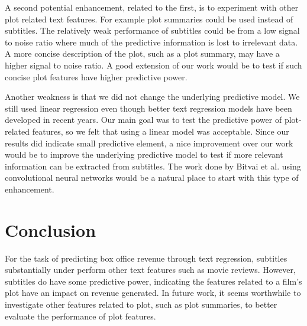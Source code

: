 \documentclass[11pt]{article}
\begin{document}
A second potential enhancement, related to the first, is to experiment with other
plot related text features. For example plot summaries could be used instead of subtitles.
The relatively weak performance of subtitles could be from a low signal to noise ratio
where much of the predictive information is lost to irrelevant data. A more concise
description of the plot, such as a plot summary, may have a higher signal to noise ratio.
A good extension of our work would be to test if such concise plot features have higher
predictive power.

Another weakness is that we did not change the underlying predictive model. We still
used linear regression even though better text regression models have been developed in
recent years. Our main goal was to test the predictive power of plot-related features, so
we felt that using a linear model was acceptable. Since our results did indicate small
predictive element, a nice improvement over our work would be to improve the underlying
predictive model to test if more relevant information can be extracted from subtitles.
The work done by Bitvai et al. using convolutional neural networks would be a natural place
to start with this type of enhancement. 

\section{Conclusion}
For the task of predicting box office revenue through text regression, subtitles
substantially under perform other text features such as movie reviews. However,
subtitles do have some predictive power, indicating the features related to a film's plot
have an impact on revenue generated. In future work, it seems worthwhile to investigate other
features related to plot, such as plot summaries, to better evaluate the
performance of plot features.
\end{document}
